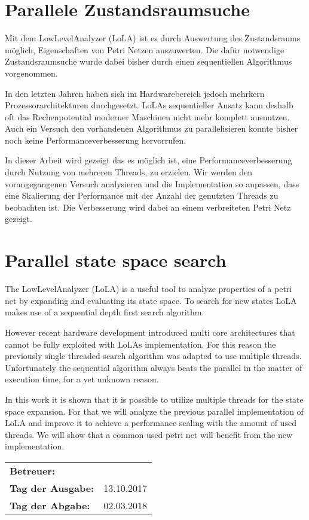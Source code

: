 \section*{Parallele Zustandsraumsuche}
Mit dem LowLevelAnalyzer (LoLA) ist es durch Auswertung des Zustandsraums möglich, Eigenschaften von Petri Netzen auszuwerten. Die dafür notwendige Zustandsraumsuche wurde dabei bisher durch einen sequentiellen Algorithmus vorgenommen.

In den letzten Jahren haben sich im Hardwarebereich jedoch mehrkern Prozessorarchitekturen durchgesetzt. LoLAs sequentieller Ansatz kann deshalb oft das Rechenpotential moderner Maschinen nicht mehr komplett ausnutzen. Auch ein Versuch den vorhandenen Algorithmus zu parallelisieren konnte bisher noch keine Performanceverbesserung hervorrufen.

In dieser Arbeit wird gezeigt das es möglich ist, eine Performanceverbesserung durch Nutzung von mehreren Threads, zu erzielen. Wir werden den vorangegangenen Versuch analysieren und die Implementation so anpassen, dass eine Skalierung der Performance mit der Anzahl der genutzten Threads zu beobachten ist. Die Verbesserung wird dabei an einem verbreiteten Petri Netz gezeigt.

\section*{Parallel state space search}
The LowLevelAnalyzer (LoLA) is a useful tool to analyze properties of a petri net by expanding and evaluating its state space. To search for new states LoLA makes use of a sequential depth first search algorithm.

However recent hardware development introduced multi core architectures that cannot be fully exploited with LoLAs implementation. For this reason the previously single threaded search algorithm was adapted to use multiple threads. Unfortunately the sequential algorithm always beats the parallel in the matter of execution time, for a yet unknown reason.

In this work it is shown that it is possible to utilize multiple threads for the state space expansion. For that we will analyze the previous parallel implementation of LoLA and improve it to achieve a performance scaling with the amount of used threads. We will show that a common used petri net will benefit from the new implementation.



\vfill

\begin{tabular}{ll}
	\bfseries Betreuer: & \parbox[t]{10cm}{\betreuer }\vspace{5mm} \\
	\bfseries Tag der Ausgabe: & 13.10.2017 \\
	\bfseries Tag der Abgabe: & 02.03.2018 \\
\end{tabular}